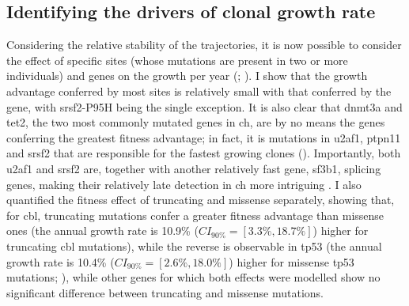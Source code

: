 \begin{figure}[!ht]
	\label{fig:ch-bad-trajectories-examples}
\end{figure}

\subsection{Identifying the drivers of clonal growth rate}

Considering the relative stability of the trajectories, it is now possible to consider the effect of specific sites (whose mutations are present in two or more individuals) and genes on the growth per year (; ). I show that the growth advantage conferred by most sites is relatively small with that conferred by the gene, with \ac{srsf2}-P95H being the single exception. It is also clear that \ac{dnmt3a} and \ac{tet2}, the two most commonly mutated genes in \ac{ch}, are by no means the genes conferring the greatest fitness advantage; in fact, it is mutations in \ac{u2af1}, \ac{ptpn11} and \ac{srsf2} that are responsible for the fastest growing clones (\tableref{}). Importantly, both \ac{u2af1} and \ac{srsf2} are, together with another relatively fast gene, \ac{sf3b1}, splicing genes, making their relatively late detection in \ac{ch} more intriguing \cite{McKerrell2015}. I also quantified the fitness effect of truncating and missense separately, showing that, for \ac{cbl}, truncating mutations confer a greater fitness advantage than missense ones (the annual growth rate is 10.9\% ($CI_{90\%}=[3.3\%,18.7\%]$) higher for truncating \ac{cbl} mutations), while the reverse is observable in \ac{tp53} (the annual growth rate is 10.4\% ($CI_{90\%}=[2.6\%,18.0\%]$) higher for missense \ac{tp53} mutations; ), while other genes for which both effects were modelled show no significant difference between truncating and missense mutations.

\begin{figure}[!ht]
	\label{fig:ch-gene-site-coefficients}
\end{figure}

